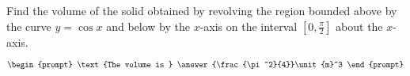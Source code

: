 \documentclass{ximera}
\author{Gregory Hartman \and Matthew Carr}
\begin{document}
\begin{exercise}






Find the volume of the solid obtained by revolving the region bounded above by the curve $y=\cos x$ and below by the $x$-axis on the interval $[0,\frac{\pi}{2}]$ about the $x$-axis.


\[
\begin{prompt}
\text{The volume is } \answer{\frac{\pi^2}{4}}\unit{m}^3
\end{prompt}
\]




\end{exercise}
\end{document}

